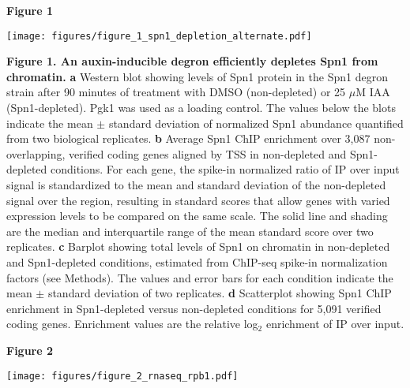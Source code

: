 \documentclass[8pt]{extarticle}
\begin{document}
\textbf{\large Figure 1}

\texttt{[image: figures/figure\_1\_spn1\_depletion\_alternate.pdf]}

\vspace{2em}
\textbf{Figure 1. An auxin-inducible degron efficiently depletes Spn1 from chromatin.}
\textbf{a} Western blot showing levels of Spn1 protein in the Spn1 degron strain after 90 minutes of treatment with DMSO (non-depleted) or 25 $\mu$M IAA (Spn1-depleted).
Pgk1 was used as a loading control.
The values below the blots indicate the mean $\pm$ standard deviation of normalized Spn1 abundance quantified from two biological replicates.
\textbf{b} Average Spn1 ChIP enrichment over 3,087 non-overlapping, verified coding genes aligned by TSS in non-depleted and Spn1-depleted conditions.
For each gene, the spike-in normalized ratio of IP over input signal is standardized to the mean and standard deviation of the non-depleted signal over the region, resulting in standard scores that allow genes with varied expression levels to be compared on the same scale.
The solid line and shading are the median and interquartile range of the mean standard score over two replicates.
\textbf{c} Barplot showing total levels of Spn1 on chromatin in non-depleted and Spn1-depleted conditions, estimated from ChIP-seq spike-in normalization factors (see Methods).
The values and error bars for each condition indicate the mean $\pm$ standard deviation of two replicates.
\textbf{d} Scatterplot showing Spn1 ChIP enrichment in Spn1-depleted versus non-depleted conditions for 5,091 verified coding genes.
Enrichment values are the relative log$_2$ enrichment of IP over input.

\newpage

\textbf{\large Figure 2}

\texttt{[image: figures/figure\_2\_rnaseq\_rpb1.pdf]}
\end{document}
